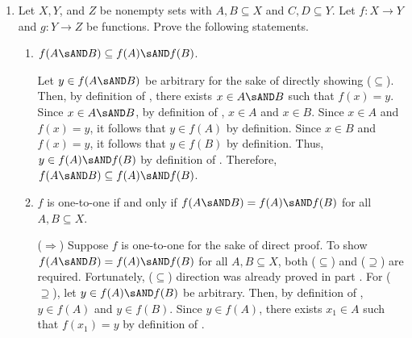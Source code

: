 \begin{enumerate}
\begin{enumerate}
\begin{subprove}
      $x \in f^{-1}(C)$ and $x \in f^{-1}(D)$.
      Since $x \in f^{-1}(C)$, it follows that $f(x) \in C$
      and $x \in f^{-1}(D)$, it follows that $f(x) \in D$ by definition,
      which logically equivalent to $f(x) \in C \sAND D$.
      Furthermore, $x \in f^{-1}(C \sAND D)$.
      Thus, $f^{-1}(C) \sAND f^{-1}(D) \subseteq f^{-1}(C \sAND D)$.\proofstep
      Therefore, by ($\subseteq$) and ($\supseteq$), $f^{-1}(C \sAND D)=f^{-1}(C) \sAND f^{-1}(D)$.
    \end{subprove}
  \end{enumerate}







  \newpage
  \item Let $X, Y$, and $Z$ be nonempty sets with $A, B \subseteq X$ and $C, D \subseteq Y$. 
  Let $f: X \rightarrow Y$ and $g: Y \rightarrow Z$ be functions. 
  Prove the following statements.
  \begin{enumerate}
    \item $f(A \sAND B) \subseteq f(A) \sAND f(B)$. \label{prob:4a}
    \begin{subprove}
      Let $y \in f(A \sAND B)$ be arbitrary for the sake of directly showing ($\subseteq$). 
      Then, by definition of , there exists $x \in A \sAND B$ such that $f(x) = y$.
      Since $x \in A \sAND B$, by definition of , $x \in A$ and $x \in B$.
      Since $x \in A$ and $f(x) = y$, it follows that $y \in f(A)$ by definition.
      Since $x \in B$ and $f(x) = y$, it follows that $y \in f(B)$ by definition.
      Thus, $y \in f(A) \sAND f(B)$ by definition of .
      Therefore, $f(A \sAND B) \subseteq f(A) \sAND f(B)$.
    \end{subprove}
    \item $f$ is one-to-one if and only if $f(A \sAND B)=f(A) \sAND f(B)$ for all $A, B \subseteq X$.
    \begin{subprove}
      ($\Rightarrow$) Suppose $f$ is one-to-one for the sake of direct proof. 
      To show $f(A \sAND B)=f(A) \sAND f(B)$ for all $A, B \subseteq X$, 
      both ($\subseteq$) and ($\supseteq$) are required.
      Fortunately, ($\subseteq$) direction was already proved in part .\proofstep
      For ($\supseteq$), let $y \in f(A) \sAND f(B)$ be arbitrary. 
      Then, by definition of , $y \in f(A)$ and $y \in f(B)$.
      Since $y \in f(A)$, there exists $x_1 \in A$ such that $f(x_1) = y$ by definition of .

\end{subprove}
\end{enumerate}
\end{enumerate}
